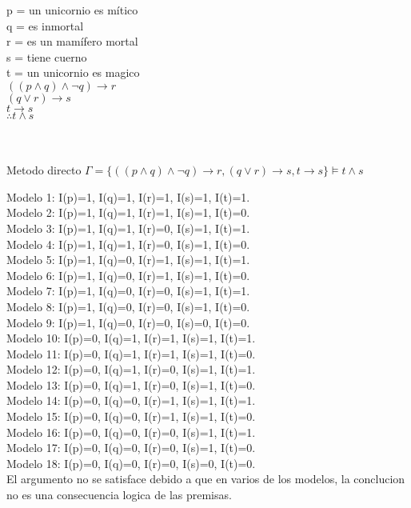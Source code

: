 \documentclass{report}%
\begin{document}
{\small 
p = un unicornio es mítico\\
q = es inmortal\\
r = es un mamífero mortal\\
s = tiene cuerno\\
t = un unicornio es magico\\

$((p \wedge q)\wedge \neg q) \rightarrow r$\\
$(q \vee r)\rightarrow s$\\
$t \rightarrow s$\\
$\therefore t \wedge s$\\

}\\

\\
{\small
Metodo directo
$\Gamma = \{((p \wedge q)\wedge \neg q) \rightarrow r, (q \vee r)\rightarrow s,t \rightarrow s \} \models t\wedge s$

Modelo 1: I(p)=1, I(q)=1, I(r)=1, I(s)=1, I(t)=1.\\
Modelo 2: I(p)=1, I(q)=1, I(r)=1, I(s)=1, I(t)=0.\\
Modelo 3: I(p)=1, I(q)=1, I(r)=0, I(s)=1, I(t)=1.\\
Modelo 4: I(p)=1, I(q)=1, I(r)=0, I(s)=1, I(t)=0.\\
Modelo 5: I(p)=1, I(q)=0, I(r)=1, I(s)=1, I(t)=1.\\
Modelo 6: I(p)=1, I(q)=0, I(r)=1, I(s)=1, I(t)=0.\\
Modelo 7: I(p)=1, I(q)=0, I(r)=0, I(s)=1, I(t)=1.\\
Modelo 8: I(p)=1, I(q)=0, I(r)=0, I(s)=1, I(t)=0.\\
Modelo 9: I(p)=1, I(q)=0, I(r)=0, I(s)=0, I(t)=0.\\
Modelo 10: I(p)=0, I(q)=1, I(r)=1, I(s)=1, I(t)=1.\\
Modelo 11: I(p)=0, I(q)=1, I(r)=1, I(s)=1, I(t)=0.\\
Modelo 12: I(p)=0, I(q)=1, I(r)=0, I(s)=1, I(t)=1.\\
Modelo 13: I(p)=0, I(q)=1, I(r)=0, I(s)=1, I(t)=0.\\
Modelo 14: I(p)=0, I(q)=0, I(r)=1, I(s)=1, I(t)=1.\\
Modelo 15: I(p)=0, I(q)=0, I(r)=1, I(s)=1, I(t)=0.\\
Modelo 16: I(p)=0, I(q)=0, I(r)=0, I(s)=1, I(t)=1.\\
Modelo 17: I(p)=0, I(q)=0, I(r)=0, I(s)=1, I(t)=0.\\
Modelo 18: I(p)=0, I(q)=0, I(r)=0, I(s)=0, I(t)=0.\\

El argumento no se satisface debido a que en varios de los modelos, la conclucion no es una consecuencia logica de las premisas.

}\\
\end{document}
